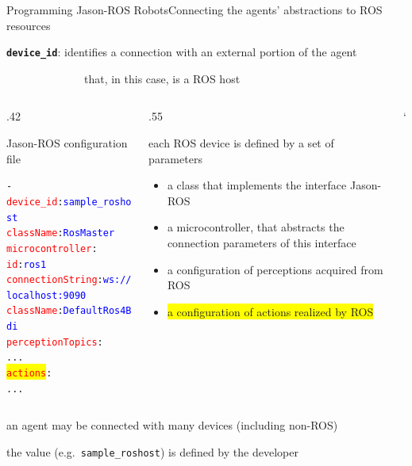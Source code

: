 \documentclass[compress]{beamer}
\newcommand{\yamlkey}[1]{\textcolor{red}{\texttt{#1}}}
\newcommand{\yamlvalue}[1]{\textcolor{blue}{\texttt{#1}}}
\begin{document}
\begin{frame}[fragile]{Programming Jason-ROS Robots}{Connecting the agents' abstractions to ROS resources}

    \footnotesize
    \texttt{{\bf device\_id}}: identifies a connection with an external portion of the agent\\ 
    
    \vspace{-.5cm}
    
    \ \ \ \ \ \ \ \ \ \ \ \ \ \ {\tiny that, in this case, is a ROS host}

    
    \begin{columns}
       \begin{column}{.42\textwidth}      
            \begin{block}{{\scriptsize Jason-ROS configuration file}}
                \scriptsize
                \begin{alltt} \tiny
- \yamlkey{device\_id}: \yamlvalue{sample\_roshost}
  \yamlkey{className}: \yamlvalue{RosMaster}
  \yamlkey{microcontroller}: 
    \yamlkey{id}: \yamlvalue{ros1} 
    \yamlkey{connectionString}: \yamlvalue{ws://localhost:9090} 
    \yamlkey{className}: \yamlvalue{DefaultRos4Bdi}
  \yamlkey{perceptionTopics}:         
    ...
  \colorbox{yellow}{\yamlkey{actions}}:       
    ...
                \end{alltt}

            \end{block}    
        \end{column}
        
        \hspace{-25pt} %
  
        \begin{column}{.55\textwidth} \scriptsize
  
            each ROS device is defined by a set of parameters
            \begin{itemize}\tiny
                \item a class that implements the interface Jason-ROS
                \item a microcontroller, that abstracts the connection parameters of this interface
                \item a configuration of perceptions acquired from ROS
                \item \colorbox{yellow}{a configuration of actions realized by ROS}
            \end{itemize}
        \end{column}`      
    \end{columns}
  
  
    \vspace{.3cm}
  
    an agent may be connected with many devices {\tiny (including non-ROS)}\\ \vspace{-.2cm}
  
    the value (e.g.~\texttt{sample\_roshost}) is defined by the developer
    
\end{frame}
\end{document}
